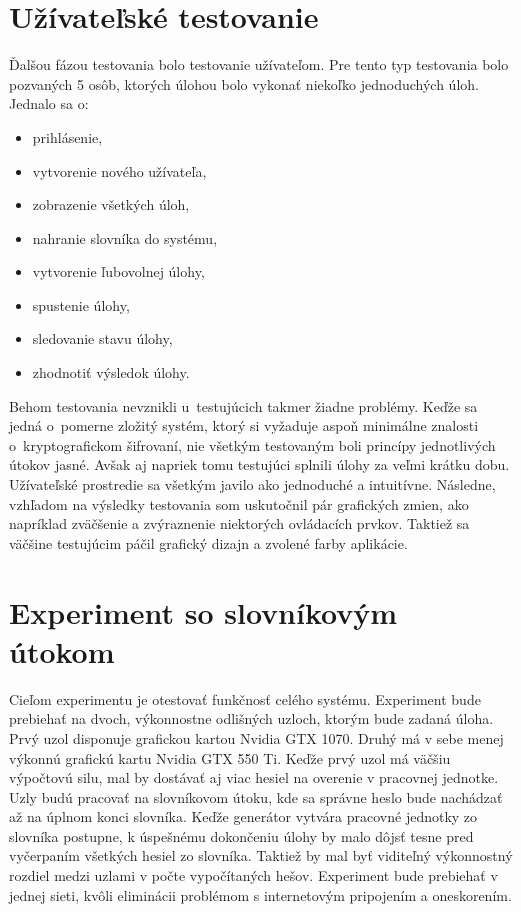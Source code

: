 \documentclass[slovak]{fitthesis}
\begin{document}
\section{Užívateľské testovanie}
Ďalšou fázou testovania bolo testovanie užívateľom. Pre tento typ testovania bolo pozvaných 5 osôb, ktorých úlohou bolo vykonať niekoľko jednoduchých úloh. Jednalo sa o:
\begin{itemize}
    \item prihlásenie,
    \item vytvorenie nového užívateľa,
    \item zobrazenie všetkých úloh,
    \item nahranie slovníka do systému,
    \item vytvorenie ľubovolnej úlohy,
    \item spustenie úlohy,
    \item sledovanie stavu úlohy,
    \item zhodnotiť výsledok úlohy.
\end{itemize}
Behom testovania nevznikli u~testujúcich takmer žiadne problémy. Keďže sa jedná o~pomerne zložitý systém, ktorý si vyžaduje aspoň minimálne znalosti o~kryptografickom šifrovaní, nie všetkým testovaným boli princípy jednotlivých útokov jasné. Avšak aj napriek tomu testujúci splnili úlohy za veľmi krátku dobu. Užívateľské prostredie sa všetkým javilo ako jednoduché a intuitívne. Následne, vzhľadom na výsledky testovania som uskutočnil pár grafických zmien, ako napríklad zväčšenie a zvýraznenie niektorých ovládacích prvkov. Taktiež sa väčšine testujúcim páčil grafický dizajn a zvolené farby aplikácie.  

\section{Experiment so slovníkovým útokom}
Cieľom experimentu je otestovať funkčnosť celého systému. Experiment bude prebiehať na dvoch, výkonnostne odlišných uzloch, ktorým bude zadaná úloha. Prvý uzol disponuje grafickou kartou Nvidia GTX 1070. Druhý má v sebe menej výkonnú grafickú kartu Nvidia GTX 550 Ti. Keďže prvý uzol má väčšiu výpočtovú silu, mal by dostávať aj viac hesiel na overenie v pracovnej jednotke. Uzly budú pracovať na slovníkovom útoku, kde sa správne heslo bude nachádzať až na úplnom konci slovníka. Keďže generátor vytvára pracovné jednotky zo slovníka postupne, k úspešnému dokončeniu úlohy by malo dôjsť tesne pred vyčerpaním všetkých hesiel zo slovníka. Taktiež by mal byť viditeľný výkonnostný rozdiel medzi uzlami v počte vypočítaných hešov. Experiment bude prebiehať v jednej sieti, kvôli eliminácii problémom s internetovým pripojením a oneskorením.
\end{document}
